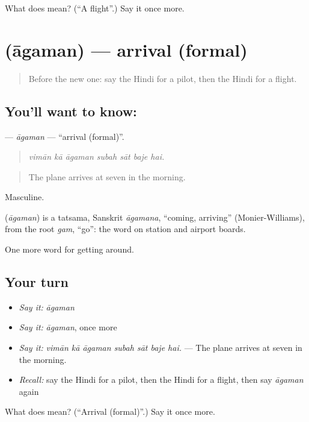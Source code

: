 \begin{tcolorbox}[breakable,colback=teal!4,colframe=teal!35!black,title={Before you move on}]
What does  mean? (\textquotedblleft{}A flight\textquotedblright{}.) Say it once more.
\end{tcolorbox}
\section[\texorpdfstring{\hi{आगमन} (āgaman)}{आगमन (āgaman)}]{ (āgaman) — arrival (formal)}

\label{lesson:HI-C409-agaman}



\begin{quote}
Before the new one: say the Hindi for a pilot, then the Hindi for a flight.
\end{quote}

\subsection*{You'll want to know: }
\textbf{} — \emph{āgaman} — \textquotedblleft{}arrival (formal)\textquotedblright{}.

\begin{quote}
      
\end{quote}

\begin{quote}
\emph{vimān kā āgaman subah sāt baje hai.}
\end{quote}

\begin{quote}
The plane arrives at seven in the morning.
\end{quote}

Masculine.

\begin{cousinweb}
\textbf{} (\emph{āgaman}) is a tatsama, Sanskrit \emph{āgamana}, \textquotedblleft{}coming, arriving\textquotedblright{} (Monier-Williams), from the root \emph{gam}, \textquotedblleft{}go\textquotedblright{}: the word on station and airport boards.
\end{cousinweb}

\begin{grammarlens}[title={What you've built}]
One more word for getting around.
\end{grammarlens}

\subsection*{Your turn}
\begin{itemize}
\raggedright
  \item \emph{Say it:} \emph{āgaman}
  \item \emph{Say it:} \emph{āgaman}, once more
  \item \emph{Say it:} \emph{vimān kā āgaman subah sāt baje hai.} — The plane arrives at seven in the morning.
  \item \emph{Recall:} say the Hindi for a pilot, then the Hindi for a flight, then say \emph{āgaman} again
\end{itemize}

\begin{tcolorbox}[breakable,colback=teal!4,colframe=teal!35!black,title={Before you move on}]
What does  mean? (\textquotedblleft{}Arrival (formal)\textquotedblright{}.) Say it once more.
\end{tcolorbox}
